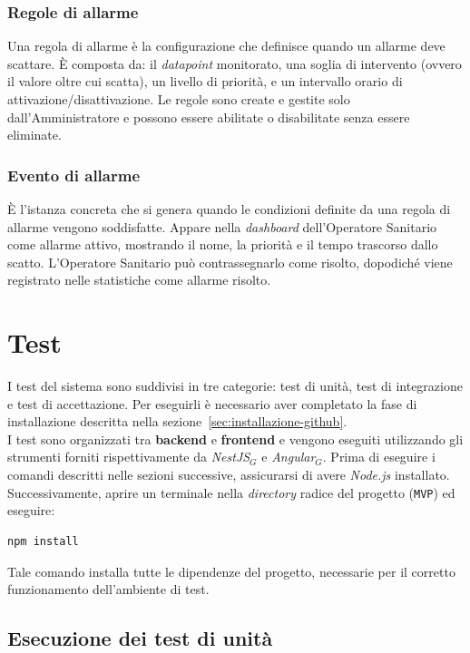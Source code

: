 \documentclass[10pt, letterpaper]{article}
\begin{document}
\subsubsection{Regole di allarme}
Una regola di allarme è la configurazione che definisce quando un 
allarme deve scattare. 
È composta da: il \textit{datapoint} monitorato, una soglia di intervento 
(ovvero il valore oltre cui scatta), un livello di priorità, 
e un intervallo orario di attivazione/disattivazione. 
Le regole sono create e gestite solo dall'Amministratore e possono essere 
abilitate o disabilitate senza essere eliminate.
\subsubsection{Evento di allarme}
È l'istanza concreta che si genera quando le condizioni definite da 
una regola di allarme vengono soddisfatte. 
Appare nella \textit{dashboard} dell'Operatore Sanitario come allarme attivo, 
mostrando il nome, la priorità e il tempo trascorso dallo scatto. 
L'Operatore Sanitario può contrassegnarlo come risolto, 
dopodiché viene registrato nelle statistiche come allarme risolto.

\section{Test}

I test del sistema sono suddivisi in tre categorie: test di unità, test di integrazione e test di accettazione.
Per eseguirli è necessario aver completato la fase di installazione descritta nella sezione~\ref{sec:installazione-github}.
\\I test sono organizzati tra \textbf{backend} e \textbf{frontend} e vengono eseguiti utilizzando gli strumenti forniti rispettivamente da \textit{NestJS}$_G$ e \textit{Angular}$_G$.
Prima di eseguire i comandi descritti nelle sezioni successive, assicurarsi di avere \textit{Node.js} installato. Successivamente, aprire un terminale nella \textit{directory} radice del progetto (\texttt{MVP}) ed eseguire:
\begin{verbatim}
npm install
\end{verbatim}
Tale comando installa tutte le dipendenze del progetto, necessarie per il corretto funzionamento dell'ambiente di test.
\subsection{Esecuzione dei test di unità}
\end{document}
